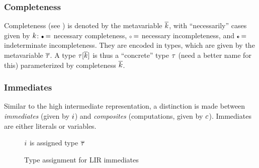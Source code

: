 \documentclass[index.tex]{subfiles}
\begin{document}
\subsubsection{Completeness}
\label{sec:lir-completeness}
Completeness (see ) is denoted by the metavariable $\overline{k}$, with
``necessarily'' cases given by $k$: $\CNC =$ necessary completeness, $\CNI =$
necessary incompleteness, and $\CII =$ indeterminate incompleteness. They are encoded in types,
which are given by the metavariable $\overline{\tau}$. 
%
A type $\tau[\overline{k}]$ is thus a ``concrete'' type $\tau$ (need a
better name for this) parameterized by completeness $\overline{k}$.

\subsubsection{Immediates}
\label{sec:lir-immediates}
Similar to the high intermediate representation, a distinction is made between \emph{immediates}
(given by $i$) and \emph{composites} (computations, given by $c$). Immediates
are either literals or variables.

\begin{figure}[htb!]
  \judgbox{\hasTypeCtx{\CtxVar}{\HoleCtxVar}{\SortImmVar}{\SortTypVar}}
    $i$ is assigned type $\overline{\tau}$ \\
  
  \caption{Type assignment for LIR immediates}
  \label{fig:lir-ta-imm}
\end{figure}
\end{document}
